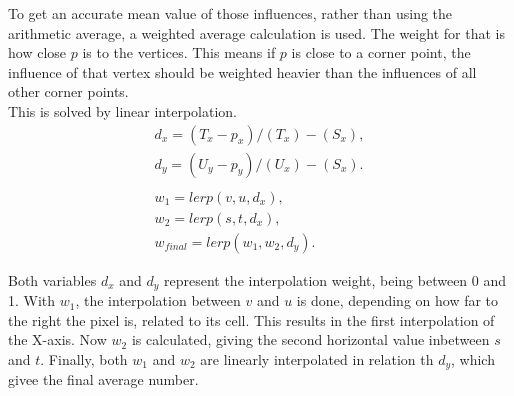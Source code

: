 \noindent
To get an accurate mean value of those influences, rather than using the arithmetic average, a weighted average calculation is used. The weight for that is how close $p$ is to the vertices.
This means if $p$ is close to a corner point, the influence of that vertex should be weighted heavier than the influences of all other corner points.
\\
This is solved by linear interpolation.
$$
\begin{array}{l}
    d_x = (T_x - p_x) / (T_x) - (S_x),\\
    d_y = (U_y - p_y) / (U_x) - (S_x).\\
    \\
    w_1 = lerp(v, u, d_x),\\
    w_2 = lerp(s, t, d_x),\\
    w_{final} = lerp(w_1, w_2, d_y).
\end{array}
$$

\noindent
Both variables $d_x$ and $d_y$ represent the interpolation weight, being between 0 and 1. With $w_1$, the interpolation between $v$ and $u$ is done, depending on how far to the right the pixel is, related to its cell.
This results in the first interpolation of the X-axis. Now $w_2$ is calculated, giving the second horizontal value inbetween $s$ and $t$.
Finally, both $w_1$ and $w_2$ are linearly interpolated in relation th $d_y$, which givee the final average number.

